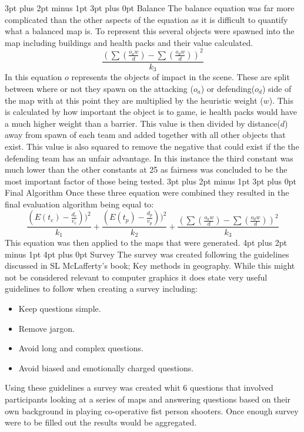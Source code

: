 \documentclass[12pt,a4paper,oneside]{book}
\makeatletter
\renewcommand\subsection{\@startsection {subsection}{1}{2mm} %
                               {3pt plus 2pt minus 1pt} %
                               {3pt plus 0pt} %
                               {\normalfont\bfseries}}
\renewcommand\section{\@startsection {section}{1}{0mm} %
                               {4pt plus 2pt minus 1pt} %
                               {4pt plus 0pt} %
                               {\bfseries}}
\makeatother
\begin{document}
\subsection{Balance}
The balance equation was far more complicated than the other aspects of the equation as it is difficult to quantify what a balanced map is. To represent this several objects were spawned into the map including buildings and health packs and their value calculated.
\begin{equation}
\frac{(\sum(\frac{o_a  w}{d}) - \sum(\frac{o_d w}{d})) ^2}{k_3} 
\end{equation}
In this equation \(o\) represents the objects of impact in the scene. These are split between where or not they spawn on the attacking (\(o_a\)) or defending(\(o_d\)) side of the map with at this point they are multiplied by the heuristic weight (\(w\)). This is calculated by how important the object is to game, ie health packs would have a much higher weight than a barrier. This value is then divided by distance(\(d\)) away from spawn of each team and added together with all other objects that exist. This value is also squared to remove the negative that could exist if the the defending team has an unfair advantage. In this instance the third constant was much lower than the other constants at 25 as fairness was concluded to be the most important factor of those being tested.
\subsection{Final Algorithm}
Once these three equation were combined they resulted in the final evaluation algorithm being equal to:  
\begin{equation}
\frac{(E(t_c)  - \frac{d_c}{v_c}))^2}{k_1} + \frac{(E(t_p)  - \frac{d_p}{v_p}))^2}{k_2} + \frac{(\sum(\frac{o_a  w}{d}) - \sum(\frac{o_d w}{d})) ^2}{k_3} 
\end{equation} 
This equation was then applied to the maps that were generated.
\section{Survey}
The survey was created following the guidelines discussed in SL McLafferty's book; Key methods in geography\cite{Geog}. While this might not be considered relevant to computer graphics it does state very useful guidelines to follow when creating a survey including:
\begin{itemize}
\item Keep questions simple.
\item Remove jargon.
\item Avoid long and complex questions.
\item Avoid biased and emotionally charged questions.
\end{itemize}
Using these guidelines a survey was created whit 6 questions that involved participants looking at a series of maps and answering questions based on their own background in playing co-operative fist person shooters. Once enough survey were to be filled out the results would be aggregated.    
\end{document}
